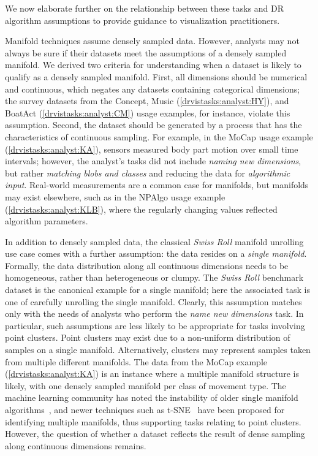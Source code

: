 We now elaborate further on the relationship between these tasks and \ac{DR} algorithm assumptions to provide guidance to visualization practitioners.

Manifold techniques assume densely sampled data. 
However, analysts may not always be sure if their datasets meet the assumptions of a densely sampled manifold. 
We derived two criteria for understanding when a dataset is likely to qualify as a densely sampled manifold. 
First, all dimensions should be numerical and continuous, which negates any datasets containing categorical dimensions; the survey datasets from the {\sc Concept, Music} (\ref{drvistasks:analyst:HY}), and {\sc BoatAct} (\ref{drvistasks:analyst:CM})
usage examples, for instance, violate this assumption. 
Second, the dataset should be generated by a process that has the characteristics of continuous sampling. 
For example, 
in the {\sc MoCap} usage example (\ref{drvistasks:analyst:KA}), sensors measured body part motion over small time intervals; however, the analyst's tasks did not include {\it naming new dimensions}, but rather {\it matching blobs and classes} and reducing the data for {\it algorithmic input}.
Real-world measurements are a common case for manifolds, but manifolds may exist elsewhere, such as in the {\sc NPAlgo} usage example (\ref{drvistasks:analyst:KLB}), where the regularly changing values reflected algorithm parameters. 

In addition to densely sampled data, the classical {\it Swiss Roll} manifold unrolling use case comes with a further assumption: the data resides on a {\it single manifold}. 
Formally, the data distribution along all continuous dimensions needs to be homogeneous, rather than heterogeneous or clumpy. 
The {\it Swiss Roll} benchmark dataset is the canonical example for a single manifold; here the associated task is one of carefully unrolling the single manifold. 
Clearly, this assumption matches only with the needs of analysts who perform the {\it name new dimensions} task. 
In particular, such assumptions are less likely to be appropriate for tasks involving point clusters. 
Point clusters may exist due to a non-uniform distribution of samples on a single manifold.
Alternatively, clusters may represent samples taken from multiple different manifolds. 
The data from the {\sc MoCap} example (\ref{drvistasks:analyst:KA}) is an instance where a multiple manifold structure is likely, with one densely sampled manifold per class of movement type. 
The machine learning community has noted the instability of older single manifold algorithms~\cite{Balasubramanian2002,VanderMaaten2009}, and newer techniques such as \ac{t-SNE}~\cite{VanderMaaten2008} have been proposed for identifying multiple manifolds, thus supporting tasks relating to point clusters. 
However, the question of whether a dataset reflects the result of dense sampling along continuous dimensions remains.

